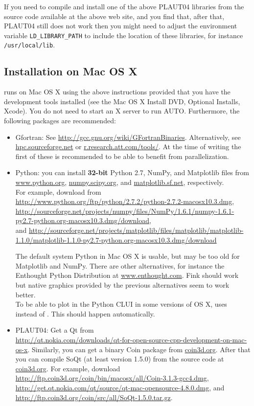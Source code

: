 \documentclass[12pt]{report}
\begin{document}
If you need to compile and install one of the above {\cal PLAUT04} libraries
from the source code available at the above web site, and you
find that, after that, {\cal PLAUT04} still does not work then you might need to
adjust the environment variable {\tt LD\_LIBRARY\_PATH} to include
the location of these libraries, for instance {\tt /usr/local/lib}.

\subsection{Installation on Mac OS X}
\AUTO runs on Mac OS X using the above instructions provided that
you have the development tools
installed (see the Mac OS X Install DVD, Optional Installs, Xcode).
You do not need to start an X server to run AUTO.
Furthermore, the following packages are recommended:
\begin{itemize}
\item Gfortran: See \url{http://gcc.gnu.org/wiki/GFortranBinaries}.
Alternatively, see \url{hpc.sourceforge.net} or \url{r.research.att.com/tools/}.
At the time of writing the first of these is recommended to be able
to benefit from parallelization.
\item Python: you can install \textbf{32-bit} Python 2.7, NumPy, and
Matplotlib  files
from \url{www.python.org}, \url{numpy.scipy.org},
and \url{matplotlib.sf.net}, respectively.\\
For example, download from\\
\url{http://www.python.org/ftp/python/2.7.2/python-2.7.2-macosx10.3.dmg},\\
\url{http://sourceforge.net/projects/numpy/files/NumPy/1.6.1/numpy-1.6.1-py2.7-python.org-macosx10.3.dmg/download},\\
and 
\url{http://sourceforge.net/projects/matplotlib/files/matplotlib/matplotlib-1.1.0/matplotlib-1.1.0-py2.7-python.org-macosx10.3.dmg/download}

The default system Python in Mac OS X is usable, but may be too old for
Matplotlib and NumPy.
There are other alternatives, for instance the Enthought Python
Distribution at \url{www.enthought.com}. Fink should work but native
graphics provided by the previous alternatives seem to work better.\\
To be able to plot in the Python CLUI in some versions of OS X,
\AUTO uses  instead of .
This should happen automatically.
\item {\cal PLAUT04}: Get a Qt  from\\
\url{http://qt.nokia.com/downloads/qt-for-open-source-cpp-development-on-mac-os-x}.
Similarly, you can get a binary Coin package from \url{coin3d.org}.
After that you can compile SoQt (at least version 1.5.0)
from the source code at \url{coin3d.org}.
For example, download
\url{http://ftp.coin3d.org/coin/bin/macosx/all/Coin-3.1.3-gcc4.dmg},
\url{http://get.qt.nokia.com/qt/source/qt-mac-opensource-4.8.0.dmg}, and
\url{http://ftp.coin3d.org/coin/src/all/SoQt-1.5.0.tar.gz}.


\end{itemize}
\end{document}
